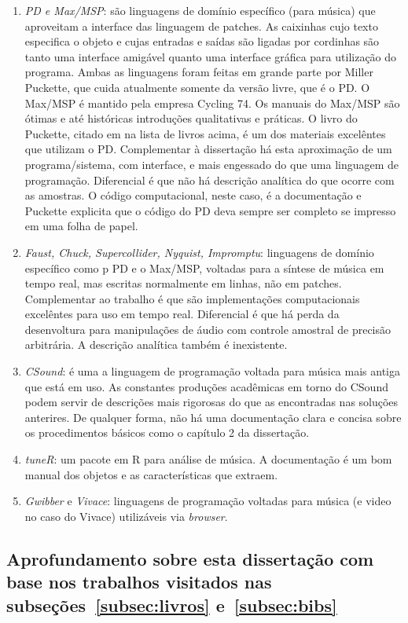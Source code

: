 \begin{enumerate}
    \item \emph{PD e Max/MSP}: são linguagens de domínio específico (para música) que aproveitam a interface das linguagem de patches. As caixinhas cujo texto especifica o objeto e cujas entradas e saídas são ligadas por cordinhas são tanto uma interface amigável quanto uma interface gráfica para utilização do programa. Ambas as linguagens foram feitas em grande parte por Miller Puckette, que cuida atualmente somente da versão livre, que é o PD. O Max/MSP é mantido pela empresa Cycling 74. Os manuais do Max/MSP são ótimas e até históricas introduções qualitativas e práticas. O livro do Puckette, citado em na lista de livros acima, é um dos materiais excelêntes que utilizam o PD. Complementar à dissertação há esta aproximação de um programa/sistema, com interface, e mais engessado do que uma linguagem de programação. Diferencial é que não há descrição analítica do que ocorre com as amostras. O código computacional, neste caso, é a documentação e Puckette explicita que o código do PD deva sempre ser completo se impresso em uma folha de papel.
    \item \emph{Faust, Chuck, Supercollider, Nyquist, Impromptu}: linguagens de domínio específico como p PD e o Max/MSP, voltadas para a síntese de música em tempo real, mas escritas normalmente em linhas, não em patches. Complementar ao trabalho é que são implementações computacionais excelêntes para uso em tempo real. Diferencial é que há perda da desenvoltura para manipulações de áudio com controle amostral de precisão arbitrária. A descrição analítica também é inexistente. 
    \item \emph{CSound}: é uma a linguagem de programação voltada para música mais antiga que está em uso. As constantes produções acadêmicas em torno do CSound podem servir de descrições mais rigorosas do que as encontradas nas soluções anterires. De qualquer forma, não há uma documentação clara e concisa sobre os procedimentos básicos como o capítulo 2 da dissertação. 
    \item \emph{tuneR}: um pacote em R para análise de música. A documentação é um bom manual dos objetos e as características que extraem. 
    \item \emph{Gwibber} e \emph{Vivace}: linguagens de programação voltadas para música (e video no caso do Vivace) utilizáveis via \emph{browser}.
\end{enumerate}


\subsection{Aprofundamento sobre esta dissertação com base nos trabalhos visitados nas subseções~\ref{subsec:livros} e~\ref{subsec:bibs}}

